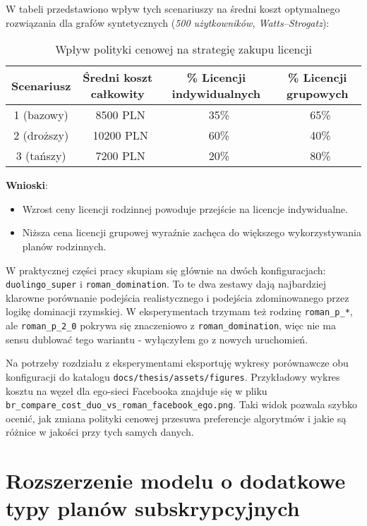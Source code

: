 W tabeli przedstawiono wpływ tych scenariuszy na średni koszt optymalnego rozwiązania dla grafów syntetycznych (\textit{500 użytkowników, Watts–Strogatz}):

\begin{table}[h]
\centering
\begin{tabular}{|c|c|c|c|}
\hline
\textbf{Scenariusz} & \textbf{Średni koszt całkowity} & \textbf{\% Licencji indywidualnych} & \textbf{\% Licencji grupowych} \\
\hline
1 (bazowy) & ~8500 PLN  & ~35\%  & ~65\%  \\
2 (droższy) & ~10200 PLN  & ~60\%  & ~40\%  \\
3 (tańszy) & ~7200 PLN  & ~20\%  & ~80\%  \\
\hline
\end{tabular}
\caption{Wpływ polityki cenowej na strategię zakupu licencji}
\label{tab:pricing_impact}
\end{table}

\textbf{Wnioski}:
\begin{itemize}
    \item Wzrost ceny licencji rodzinnej powoduje przejście na licencje indywidualne.
    \item Niższa cena licencji grupowej wyraźnie zachęca do większego wykorzystywania planów rodzinnych.
\end{itemize}

W praktycznej części pracy skupiam się głównie na dwóch konfiguracjach: \texttt{duolingo\_super} i \texttt{roman\_domination}. To te dwa zestawy dają najbardziej klarowne porównanie podejścia realistycznego i podejścia zdominowanego przez logikę dominacji rzymskiej. W eksperymentach trzymam też rodzinę \texttt{roman\_p\_*}, ale \texttt{roman\_p\_2\_0} pokrywa się znaczeniowo z \texttt{roman\_domination}, więc nie ma sensu dublować tego wariantu - wyłączyłem go z nowych uruchomień.

Na potrzeby rozdziału z eksperymentami eksportuję wykresy porównawcze obu konfiguracji do katalogu \texttt{docs/thesis/assets/figures}. Przykładowy wykres kosztu na węzeł dla ego-sieci Facebooka znajduje się w pliku \texttt{br\_compare\_cost\_duo\_vs\_roman\_facebook\_ego.png}. Taki widok pozwala szybko ocenić, jak zmiana polityki cenowej przesuwa preferencje algorytmów i jakie są różnice w jakości przy tych samych danych.

\section{Rozszerzenie modelu o dodatkowe typy planów subskrypcyjnych}

